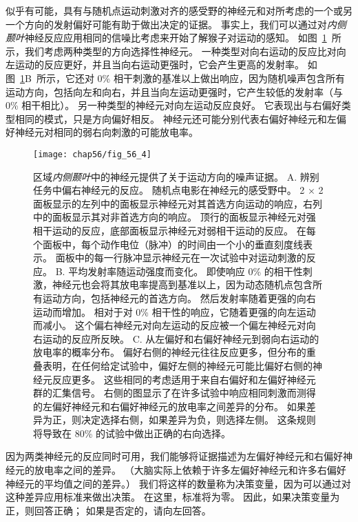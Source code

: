 似乎有可能，具有与随机点运动刺激对齐的感受野的神经元和对所考虑的一个或另一个方向的发射偏好可能有助于做出决定的证据。
事实上，我们可以通过对\textit{内侧颞叶}神经反应应用相同的信噪比考虑来开始了解猴子对运动的感知。
如图~\ref{fig:56_4}~所示，我们考虑两种类型的方向选择性神经元。
一种类型对向右运动的反应比对向左运动的反应更好，并且当向右运动更强时，它会产生更高的发射率。
如图~\ref{fig:56_4}B~所示，它还对 0\% 相干刺激的基准以上做出响应，因为随机噪声包含所有运动方向，包括向左和向右，并且当向左运动更强时，它产生较低的发射率（与 0\% 相干相比）。
另一种类型的神经元对向左运动反应良好。
它表现出与右偏好类型相同的模式，只是方向偏好相反。
神经元还可能分别代表右偏好神经元和左偏好神经元对相同的弱右向刺激的可能放电率。


\begin{figure}[htbp]
	\centering
	\texttt{[image: chap56/fig\_56\_4]}
	\caption{区域\textit{内侧颞叶}中的神经元提供了关于运动方向的噪声证据。
		A. 辨别任务中偏右神经元的反应。
		随机点电影在神经元的感受野中。
		2 × 2 面板显示的左列中的面板显示神经元对其首选方向运动的响应，右列中的面板显示其对非首选方向的响应。
		顶行的面板显示神经元对强相干运动的反应，底部面板显示神经元对弱相干运动的反应。
		在每个面板中，每个动作电位（脉冲）的时间由一个小的垂直刻度线表示。
		面板中的每一行脉冲显示神经元在一次试验中对运动刺激的反应\cite{mazurek2003role}。
		B. 平均发射率随运动强度而变化。
		即使响应 0\% 的相干性刺激，神经元也会将其放电率提高到基准以上，因为动态随机点包含所有运动方向，包括神经元的首选方向。
		然后发射率随着更强的向右运动而增加。
		相对于对 0\% 相干性的响应，它随着更强的向左运动而减小。
		这个偏右神经元对向左运动的反应被一个偏左神经元对向右运动的反应所反映。
		C. 从左偏好和右偏好神经元到弱向右运动的放电率的概率分布。
		偏好右侧的神经元往往反应更多，但分布的重叠表明，在任何给定试验中，偏好左侧的神经元可能比偏好右侧的神经元反应更多。
		这些相同的考虑适用于来自右偏好和左偏好神经元群的汇集信号。
		右侧的图显示了在许多试验中响应相同刺激而测得的左偏好神经元和右偏好神经元的放电率之间差异的分布。
		如果差异为正，则决定选择右侧，如果差异为负，则选择左侧。
		这条规则将导致在 80\% 的试验中做出正确的右向选择。}
	\label{fig:56_4}
\end{figure}


因为两类神经元的反应同时可用，我们能够将证据描述为左偏好神经元和右偏好神经元的放电率之间的差异。
（大脑实际上依赖于许多左偏好神经元和许多右偏好神经元的平均值之间的差异。）
我们将这样的数量称为决策变量，因为可以通过对这种差异应用标准来做出决策。
在这里，标准将为零。
因此，如果决策变量为正，则回答正确；
如果是否定的，请向左回答。



